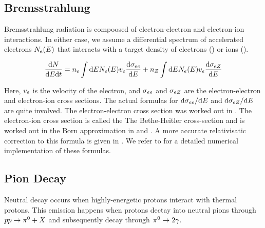 \subsection{Bremsstrahlung}

Bremsstrahlung radiation is compoosed of electron-electron and electron-ion interactions.
In either case, 
we assume a 
differential spectrum of accelerated electrons $N_e(E)$ 
that interacts with a target density of electrons (\ElectronDensity) or ions (\IonDensity).

\begin{equation}
  \frac{\text{d} N}{\text{d}E\text{d}t} =
  n_e \int \text{d}E
  N_e(E) v_e
  \frac{\text{d}\sigma_{ee}}{\text{d}E} +
  n_Z \int \text{d}E
  N_e(E) v_e
  \frac{\text{d}\sigma_{eZ}}{\text{d}E}
\end{equation}

Here, $v_e$ is the velocity of the
electron, and $\sigma_{ee}$ and
$\sigma_{eZ}$ are the electron-electron and
electron-ion cross sections.
The actual formulas for 
$\text{d}\sigma_{ee}/\text{d}E$
and 
$\text{d}\sigma_{eZ}/\text{d}E$
are quite involved.  The electron-electron cross section was worked out
in \cite{haug_1975a_bremsstrahlung-production}.  The electron-ion cross
section is called the The Bethe-Heitler cross-section and is worked
out in the Born approximation in \cite{heitler_1953a_quantum-theory}
and \cite{koch_1959a_bremsstrahlung-cross-section}.  A more
accurate relativisatic correction to this formula is given in
\cite{haug_1997a_nonrelativistic-bremsstrahlung}.  We refer
to \cite{houck_2006a_models-nonthermal} for a detailed numerical
implementation of these formulas.

\subsection{Pion Decay}

Neutral \pion decay occurs when highly-energetic protons interact with
thermal protons. This
emission happens when protons dectay into neutral pions through $pp \rightarrow
\pi^0 + X$ and subsequently decay through $\pi^0 \rightarrow 2\gamma$.

